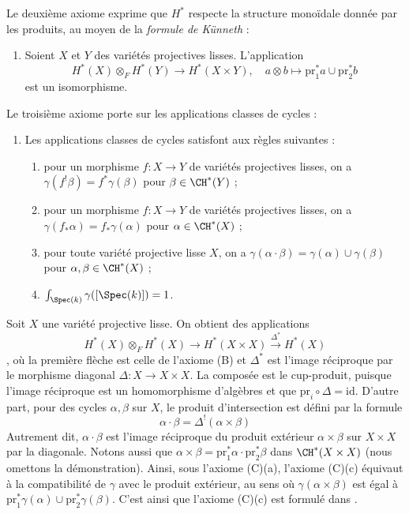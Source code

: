 \noindent
Le deuxième axiome exprime que $H^*$ respecte la structure monoïdale
donnée par les produits, au moyen de la {\it formule de K\"unneth} :
\begin{enumerate}
\item[(B)] Soient $X$ et $Y$ des variétés projectives lisses. L'application
$$
H^*(X) \otimes_F H^*(Y) \to H^*(X \times Y),\quad
a \otimes b \mapsto \text{pr}_1^*a \cup \text{pr}_2^*b
$$
est un isomorphisme.
\end{enumerate}
Le troisième axiome porte sur les applications classes de cycles :
\begin{enumerate}
\item[(C)] Les applications classes de cycles satisfont aux règles suivantes :
\begin{enumerate}
\item pour un morphisme $f : X \to Y$ de variétés projectives lisses,
on a $\gamma(f^!\beta) = f^*\gamma(\beta)$ pour $\beta \in \CH^*(Y)$ ;
\item pour un morphisme $f : X \to Y$ de variétés projectives lisses, on a
$\gamma(f_*\alpha) = f_*\gamma(\alpha)$ pour $\alpha \in \CH^*(X)$ ;
\item pour toute variété projective lisse $X$, on a
$\gamma(\alpha \cdot \beta) = \gamma(\alpha) \cup \gamma(\beta)$
pour $\alpha, \beta \in \CH^*(X)$ ;
\item $\int_{\Spec(k)} \gamma([\Spec(k)]) = 1$.
\end{enumerate}
\end{enumerate}

\begin{remark}
\label{remark-replace-cup-product-classical}
Soit $X$ une variété projective lisse. On obtient des applications
$$
H^*(X) \otimes_F H^*(X) \longrightarrow H^*(X \times X)
\xrightarrow{\Delta^*} H^*(X)
$$,
où la première flèche est celle de l'axiome (B) et $\Delta^*$
est l'image réciproque par le morphisme diagonal $\Delta : X \to X \times X$.
La composée est le cup-produit, puisque l'image réciproque est un homomorphisme d'algèbres
et que $\text{pr}_i \circ \Delta = \text{id}$.
D'autre part, pour des cycles $\alpha, \beta$ sur $X$,
le produit d'intersection est défini par la formule
$$
\alpha \cdot \beta =
\Delta^!(\alpha \times \beta)
$$
Autrement dit, $\alpha \cdot \beta$ est l'image réciproque du
produit extérieur $\alpha \times \beta$ sur $X \times X$ par
la diagonale. Notons aussi que
$\alpha \times \beta = \text{pr}_1^*\alpha \cdot \text{pr}_2^*\beta$
dans $\CH^*(X \times X)$ (nous omettons la démonstration). Ainsi, sous l'axiome (C)(a),
l'axiome (C)(c) équivaut à la compatibilité de $\gamma$
avec le produit extérieur, au sens où
$\gamma(\alpha \times \beta)$ est égal à
$\text{pr}_1^*\gamma(\alpha) \cup \text{pr}_2^*\gamma(\beta)$.
C'est ainsi que l'axiome (C)(c) est formulé dans \cite{Kleiman-cycles}.
\end{remark}


